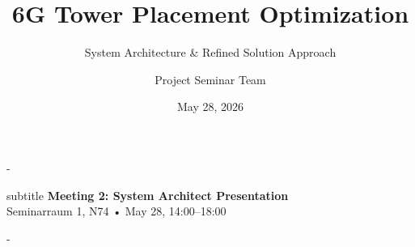 \documentclass[final]{beamer}
\title[6G Tower Placement]{6G Tower Placement Optimization}
\subtitle{System Architecture \& Refined Solution Approach}
\author[Project Seminar]{
Project Seminar Team
}
\institute[FAU]{%
Friedrich-Alexander-Universität Erlangen-Nürnberg
}
\date{May 28, 2026}
\begin{document}
\begin{frame}[t,titleimage]{-}
\titlepage%
\vspace*{-1cm}
\begin{beamercolorbox}[sep=8pt,center]{subtitle}
	\textbf{Meeting 2: System Architect Presentation}\\
	Seminarraum 1, N74 • May 28, 14:00–18:00
\end{beamercolorbox}
\end{frame}

\begin{frame}[title]{-}             
\tableofcontents
\end{frame}








\end{document}
